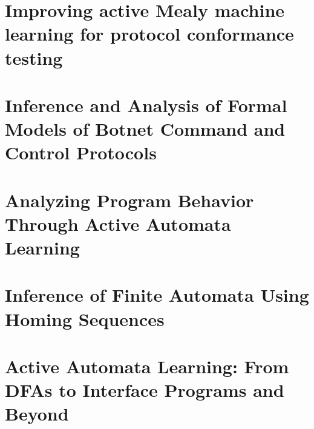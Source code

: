 \documentclass[11pt]{article}
\begin{document}
\section{\cite{Aarts13} Improving active Mealy machine learning for protocol conformance testing}
\section{\cite{Cho10} Inference and Analysis of Formal Models of Botnet Command and Control Protocols}
\section{\cite{Bauer14} Analyzing Program Behavior Through Active Automata Learning}
\section{\cite{Rivest93} Inference of Finite Automata Using Homing Sequences}
\section{\cite{Steffen12} Active Automata Learning: From DFAs to Interface Programs and Beyond}

{}

\end{document}
